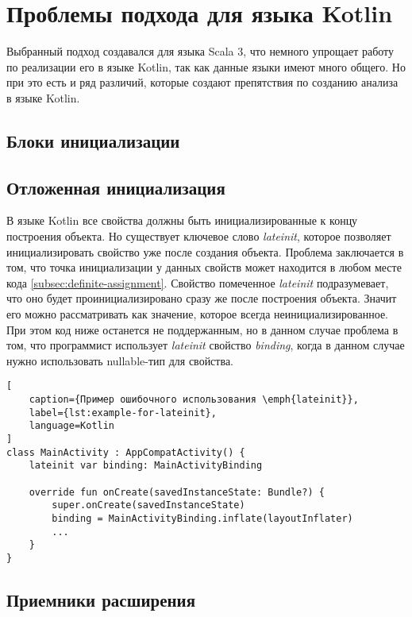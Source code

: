 \section{Проблемы подхода для языка Kotlin}\label{sec:проблемы-подхода-для-языка-kotlin}

Выбранный подход создавался для языка Scala 3, что немного упрощает работу по реализации его в языке Kotlin,
так как данные языки имеют много общего.
Но при это есть и ряд различий, которые создают препятствия по созданию анализа в языке Kotlin.

\subsection{Блоки инициализации}\label{subsec:блоки-инициализации}

\subsection{Отложенная инициализация}\label{subsec:lateinit}

В языке Kotlin все свойства должны быть инициализированные к концу построения объекта.
Но существует ключевое слово \emph{lateinit}, которое позволяет инициализировать свойство уже после создания объекта.
Проблема заключается в том, что точка инициализации у данных свойств может находится в любом месте кода \autoref{subsec:definite-assignment}.
Свойство помеченное \emph{lateinit} подразумевает,
что оно будет проинициализировано сразу же после построения объекта.
Значит его можно рассматривать как значение, которое всегда неинициализированное.
При этом код ниже останется не поддержанным, но в данном случае проблема в том,
что программист использует \emph{lateinit} свойство \emph{binding},
когда в данном случае нужно использовать nullable-тип для свойства.
\begin{lstlisting}[
    caption={Пример ошибочного использования \emph{lateinit}},
    label={lst:example-for-lateinit},
    language=Kotlin
]
class MainActivity : AppCompatActivity() {
    lateinit var binding: MainActivityBinding

    override fun onCreate(savedInstanceState: Bundle?) {
        super.onCreate(savedInstanceState)
        binding = MainActivityBinding.inflate(layoutInflater)
        ...
    }
}
\end{lstlisting}

\subsection{Приемники расширения}\label{subsec:приемники-расширения}

